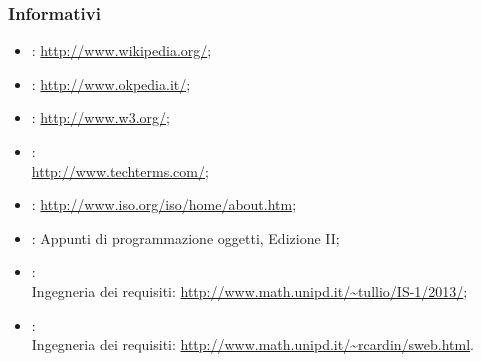 \subsubsection{Informativi} %
\label{1.4.2}
\begin{itemize}
\item {}: \url{ http://www.wikipedia.org/};
\item {}: \url{ http://www.okpedia.it/};
\item {}: \url{http://www.w3.org/};
\item {}:\\ \url{http://www.techterms.com/};
\item {}: \url{http://www.iso.org/iso/home/about.htm};
\item {}: Appunti di programmazione oggetti, Edizione II;
\item {}:\\
Ingegneria dei requisiti: \url{http://www.math.unipd.it/~tullio/IS-1/2013/};
\item {}:\\
Ingegneria dei requisiti: \url{http://www.math.unipd.it/~rcardin/sweb.html}.
\end{itemize}








